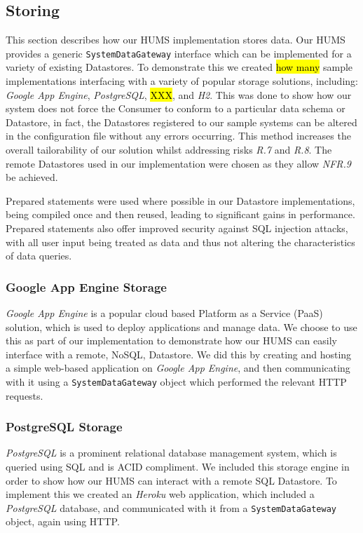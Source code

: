 \documentclass[10pt,a4paper]{article}
\begin{document}
\subsection{Storing}
\label{sec:store}
This section describes how our HUMS implementation stores data. Our HUMS provides a generic \texttt{SystemDataGateway} interface which can be implemented for a variety of existing Datastores. To demonstrate this we created \hl{how many} sample implementations interfacing with a variety of popular storage solutions, including: \emph{Google App Engine}, \emph{PostgreSQL}, \hl{XXX}, and \emph{H2}. This was done to show how our system does not force the Consumer to conform to a particular data schema or Datastore, in fact, the Datastores registered to our sample systems can be altered in the configuration file without any errors occurring. This method increases the overall tailorability of our solution whilst addressing risks \emph{R.7} and \emph{R.8}. The remote Datastores used in our implementation were chosen as they allow \emph{NFR.9} be achieved.

Prepared statements were used where possible in our Datastore implementations, being compiled once and then reused, leading to significant gains in performance. Prepared statements also offer improved security against SQL injection attacks, with all user input being treated as data and thus not altering the characteristics of data queries.

\subsubsection{Google App Engine Storage}
\emph{Google App Engine} is a popular cloud based Platform as a Service (PaaS) solution, which is used to deploy applications and manage data. We choose to use this as part of our implementation to demonstrate how our HUMS can easily interface with a remote, NoSQL, Datastore. We did this by creating and hosting a simple web-based application on \emph{Google App Engine}, and then communicating with it using a \texttt{SystemDataGateway} object which performed the relevant HTTP requests.  

\subsubsection{PostgreSQL Storage}
\emph{PostgreSQL} is a prominent relational database management system, which is queried using SQL and is ACID compliment. We included this storage engine in order to show how our HUMS can interact with a remote SQL Datastore. 
To implement this we created an \emph{Heroku} web application, which included a \emph{PostgreSQL} database, and communicated with it from a \texttt{SystemDataGateway} object, again using HTTP.
\end{document}

